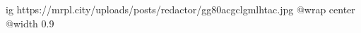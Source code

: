  
 
 
 
 

\ifcmt
  ig https://mrpl.city/uploads/posts/redactor/gg80acgclgmlhtac.jpg
  @wrap center
  @width 0.9
\fi
